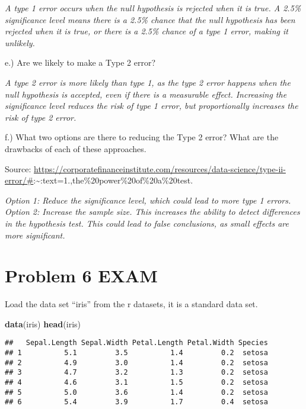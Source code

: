 \documentclass[
]{article}
\newenvironment{Shaded}{\begin{snugshade}}{\end{snugshade}}
\newcommand{\FunctionTok}[1]{\textcolor[rgb]{0.13,0.29,0.53}{\textbf{#1}}}
\newcommand{\NormalTok}[1]{#1}
\begin{document}
\emph{A type 1 error occurs when the null hypothesis is rejected when it
is true. A 2.5\% significance level means there is a 2.5\% chance that
the null hypothesis has been rejected when it is true, or there is a
2.5\% chance of a type 1 error, making it unlikely.}

e.) Are we likely to make a Type 2 error?

\emph{A type 2 error is more likely than type 1, as the type 2 error
happens when the null hypothesis is accepted, even if there is a
measurable effect. Increasing the significance level reduces the risk of
type 1 error, but proportionally increases the risk of type 2 error.}

f.) What two options are there to reducing the Type 2 error? What are
the drawbacks of each of these approaches.

Source:
\url{https://corporatefinanceinstitute.com/resources/data-science/type-ii-error/\#}:\textasciitilde:text=1.,the\%20power\%20of\%20a\%20test.

\emph{Option 1: Reduce the significance level, which could lead to more
type 1 errors.} \emph{Option 2: Increase the sample size. This increases
the ability to detect differences in the hypothesis test. This could
lead to false conclusions, as small effects are more significant.}

\section{Problem 6 EXAM}\label{problem-6-exam}

Load the data set ``iris'' from the r datasets, it is a standard data
set.

\begin{Shaded}
\begin{Highlighting}[]
\FunctionTok{data}\NormalTok{(iris)}
\FunctionTok{head}\NormalTok{(iris)}
\end{Highlighting}
\end{Shaded}

\begin{verbatim}
##   Sepal.Length Sepal.Width Petal.Length Petal.Width Species
## 1          5.1         3.5          1.4         0.2  setosa
## 2          4.9         3.0          1.4         0.2  setosa
## 3          4.7         3.2          1.3         0.2  setosa
## 4          4.6         3.1          1.5         0.2  setosa
## 5          5.0         3.6          1.4         0.2  setosa
## 6          5.4         3.9          1.7         0.4  setosa
\end{verbatim}
\end{document}
